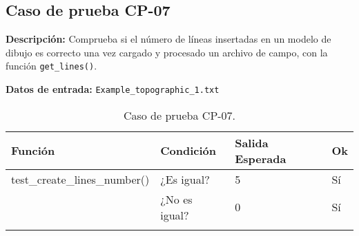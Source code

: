 \subsection{Caso de prueba CP-07}

\textbf{Descripción:} Comprueba si el número de líneas insertadas en un modelo de dibujo es correcto una vez cargado y procesado un archivo de campo, con la función \texttt{get\_lines()}.

\textbf{Datos de entrada:} \texttt{Example\_topographic\_1.txt}


\begin{longtable}[]{@{}llll@{}}
\toprule
\begin{minipage}[b]{0.6\columnwidth}\raggedright\strut
Función\strut
\end{minipage} & \begin{minipage}[b]{0.20\columnwidth}\raggedright\strut
Condición\strut
\end{minipage} & \begin{minipage}[b]{0.15\columnwidth}\raggedright\strut
Salida Esperada\strut
\end{minipage} & \begin{minipage}[b]{0.05\columnwidth}\raggedright\strut
Ok\strut
\end{minipage}\tabularnewline
\midrule
\endhead
\begin{minipage}[t]{0.6\columnwidth}\raggedright\strut
\small{test\_create\_lines\_number()}\strut
\end{minipage} & \begin{minipage}[t]{0.20\columnwidth}\raggedright\strut
¿Es igual?\strut
\end{minipage} & \begin{minipage}[t]{0.15\columnwidth}\raggedright\strut
5\strut
\end{minipage} & \begin{minipage}[t]{0.05\columnwidth}\raggedright\strut
Sí\strut
\end{minipage}\tabularnewline
\begin{minipage}[t]{0.6\columnwidth}\raggedright\strut
\strut
\end{minipage} & \begin{minipage}[t]{0.20\columnwidth}\raggedright\strut
¿No es igual?\strut
\end{minipage} & \begin{minipage}[t]{0.15\columnwidth}\raggedright\strut
0\strut
\end{minipage} & \begin{minipage}[t]{0.05\columnwidth}\raggedright\strut
Sí\strut
\end{minipage}\tabularnewline

\bottomrule
\caption{Caso de prueba CP-07.}
\end{longtable}

